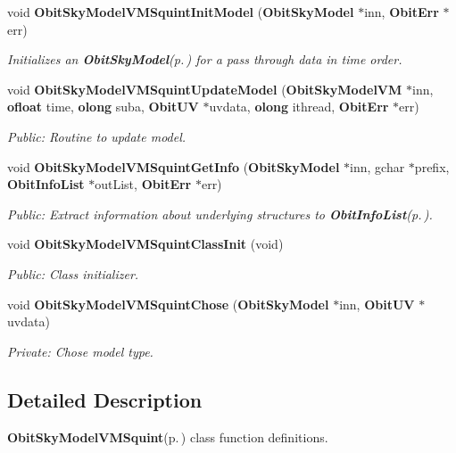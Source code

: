 \begin{CompactItemize}
void {\bf Obit\-Sky\-Model\-VMSquint\-Init\-Model} ({\bf Obit\-Sky\-Model} $\ast$inn, {\bf Obit\-Err} $\ast$err)
\begin{CompactList}\small\item\em Initializes an {\bf Obit\-Sky\-Model}{\rm (p.\,\pageref{structObitSkyModel})} for a pass through data in time order. \item\end{CompactList}\item 
void {\bf Obit\-Sky\-Model\-VMSquint\-Update\-Model} ({\bf Obit\-Sky\-Model\-VM} $\ast$inn, {\bf ofloat} time, {\bf olong} suba, {\bf Obit\-UV} $\ast$uvdata, {\bf olong} ithread, {\bf Obit\-Err} $\ast$err)
\begin{CompactList}\small\item\em Public: Routine to update model. \item\end{CompactList}\item 
void {\bf Obit\-Sky\-Model\-VMSquint\-Get\-Info} ({\bf Obit\-Sky\-Model} $\ast$inn, gchar $\ast$prefix, {\bf Obit\-Info\-List} $\ast$out\-List, {\bf Obit\-Err} $\ast$err)
\begin{CompactList}\small\item\em Public: Extract information about underlying structures to {\bf Obit\-Info\-List}{\rm (p.\,\pageref{structObitInfoList})}. \item\end{CompactList}\item 
void {\bf Obit\-Sky\-Model\-VMSquint\-Class\-Init} (void)
\begin{CompactList}\small\item\em Public: Class initializer. \item\end{CompactList}\item 
void {\bf Obit\-Sky\-Model\-VMSquint\-Chose} ({\bf Obit\-Sky\-Model} $\ast$inn, {\bf Obit\-UV} $\ast$uvdata)
\begin{CompactList}\small\item\em Private: Chose model type. \item\end{CompactList}\end{CompactItemize}


\subsection{Detailed Description}
{\bf Obit\-Sky\-Model\-VMSquint}{\rm (p.\,\pageref{structObitSkyModelVMSquint})} class function definitions. 

